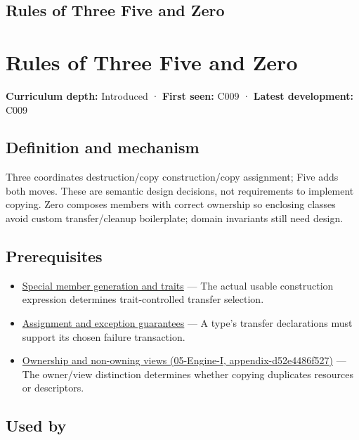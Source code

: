 \hypertarget{appendix-7679107d057e}{}
\section*{Rules of Three Five and Zero}
\chapter{Rules of Three Five and Zero}\label{appendix-7679107d057e-rules-of-three-five-and-zero}

\textbf{Curriculum depth:} Introduced · \textbf{First seen:} C009 · \textbf{Latest development:} C009

\section{Definition and mechanism}\label{appendix-7679107d057e-definition-and-mechanism}

Three coordinates destruction/copy construction/copy assignment; Five adds both moves. These are semantic design decisions, not requirements to implement copying. Zero composes members with correct ownership so enclosing classes avoid custom transfer/cleanup boilerplate; domain invariants still need design.

\section{Prerequisites}\label{appendix-7679107d057e-prerequisites}

\begin{itemize}
\tightlist
\item
  \hyperref[appendix-42e02a12c694]{Special member generation and traits} --- The actual usable construction expression determines trait-controlled transfer selection.
\item
  \hyperref[appendix-bea6beb5350f]{Assignment and exception guarantees} --- A type's transfer declarations must support its chosen failure transaction.
\item
  \href{../05-Engine-I/main.pdf\#nameddest=appendix-d52e4486f527}{Ownership and non-owning views (05-Engine-I, appendix-d52e4486f527)} --- The owner/view distinction determines whether copying duplicates resources or descriptors.
\end{itemize}

\section{Used by}\label{appendix-7679107d057e-used-by}

